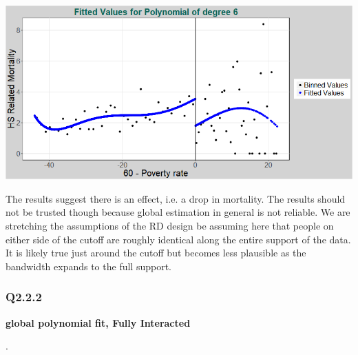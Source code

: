 \documentclass[11pt]{article}
\begin{document}
\\ \\
\includegraphics[width=.8\linewidth]{plot_221_poly_6.png}


The results suggest there is an effect, i.e. a drop in mortality. The results should not be trusted though because global estimation in general is not reliable. We are stretching the assumptions of the RD design be assuming here that people on either side of the cutoff are roughly identical along the entire support of the data. It is likely true just around the cutoff but becomes less plausible as the bandwidth expands to the full support. 

\subsubsection{Q2.2.2}


\begin{center}
	\centering
	\textbf{global polynomial fit, Fully Interacted }\par\medskip
	\scalebox{1}{
		
	}
\end{center}
 .
\\ \\ 
\end{document}
